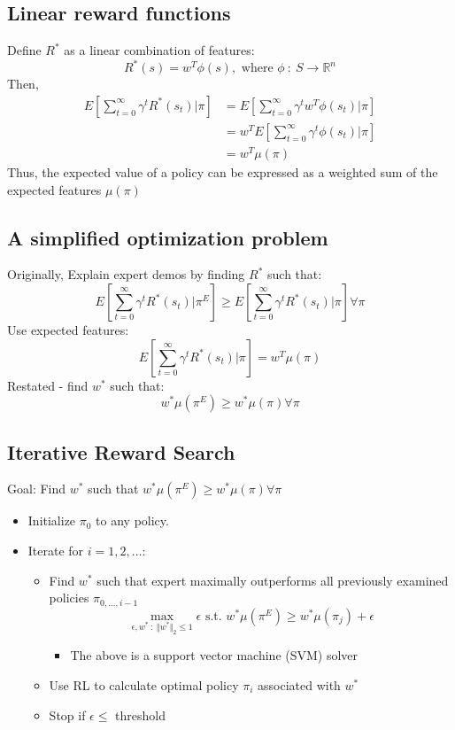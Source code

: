 \documentclass[10pt]{article}
\begin{document}
\subsection*{Linear reward functions}
Define $R^*$ as a linear combination of features:
\[R^*(s) = w^T \phi(s), \text{ where } \phi \::\: S \rightarrow \mathbb{R}^n\]
Then,
\begin{align*}
    E[\sum_{t = 0}^\infty \gamma^t R^* (s_t) | \pi] &= E[\sum_{t = 0}^\infty \gamma^t w^T \phi(s_t) | \pi] \\
    &= w^T E[\sum_{t = 0}^\infty \gamma^t \phi(s_t)|\pi]\\ 
    &= w^T \mu(\pi)
\end{align*}
Thus, the expected value of a policy can be expressed as a weighted sum of the expected features $\mu(\pi)$

\subsection*{A simplified optimization problem}
Originally, Explain expert demos by finding $R^*$ such that:
\[E[\sum_{t = 0}^\infty \gamma^t R^* (s_t) | \pi^E] \geq E[\sum_{t = 0}^\infty \gamma^t R^* (s_t) | \pi] \forall \pi\]
Use expected features:
\[E[\sum_{t = 0}^\infty \gamma^t R^* (s_t) | \pi] = w^T \mu(\pi)\]
Restated - find $w^*$ such that:
\[w^* \mu(\pi^E) \geq w^* \mu(\pi) \forall \pi\]

\subsection*{Iterative Reward Search}
Goal: Find $w^*$ such that $w^* \mu(\pi^E) \geq w^* \mu(\pi) \forall \pi$
\begin{itemize}
    \item Initialize $\pi_0$ to any policy.  
    \item Iterate for $i = 1, 2, \dots$:
    \begin{itemize}
        \item Find $w^*$ such that expert maximally outperforms all previously examined policies $\pi_{0, \dots, i - 1}$
        \[\max_{\epsilon, w^* \::\: \Vert w^* \Vert_2 \leq 1} \epsilon \text{ s.t. } w^* \mu(\pi^E) \geq w^* \mu(\pi_j) + \epsilon\]
        \begin{itemize}
            \item The above is a support vector machine (SVM) solver
        \end{itemize}
        \item Use RL to calculate optimal policy $\pi_i$ associated with $w^*$
        \item Stop if $\epsilon \leq$ threshold
    \end{itemize}
\end{itemize}
\end{document}
